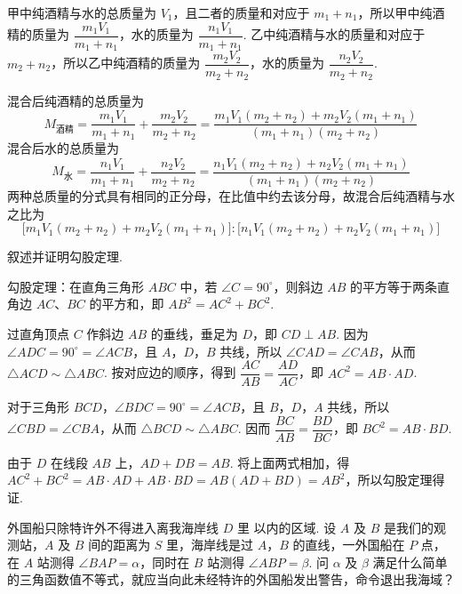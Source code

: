 \begin{solution}
甲中纯酒精与水的总质量为 \(V_{1}\)，且二者的质量和对应于 \(m_{1}+n_{1}\)，所以甲中纯酒精的质量为 \(\dfrac{m_{1}V_{1}}{m_{1}+n_{1}}\)，水的质量为 \(\dfrac{n_{1}V_{1}}{m_{1}+n_{1}}\). 乙中纯酒精与水的质量和对应于 \(m_{2}+n_{2}\)，所以乙中纯酒精的质量为 \(\dfrac{m_{2}V_{2}}{m_{2}+n_{2}}\)，水的质量为 \(\dfrac{n_{2}V_{2}}{m_{2}+n_{2}}\).

混合后纯酒精的总质量为
\[
M_{\text{酒精}}=\frac{m_{1}V_{1}}{m_{1}+n_{1}}+\frac{m_{2}V_{2}}{m_{2}+n_{2}}=\frac{m_{1}V_{1}(m_{2}+n_{2})+m_{2}V_{2}(m_{1}+n_{1})}{(m_{1}+n_{1})(m_{2}+n_{2})}
\]
混合后水的总质量为
\[
M_{\text{水}}=\frac{n_{1}V_{1}}{m_{1}+n_{1}}+\frac{n_{2}V_{2}}{m_{2}+n_{2}}=\frac{n_{1}V_{1}(m_{2}+n_{2})+n_{2}V_{2}(m_{1}+n_{1})}{(m_{1}+n_{1})(m_{2}+n_{2})}
\]
两种总质量的分式具有相同的正分母，在比值中约去该分母，故混合后纯酒精与水之比为
\[
\bigl[m_{1}V_{1}(m_{2}+n_{2})+m_{2}V_{2}(m_{1}+n_{1})\bigr]:\bigl[n_{1}V_{1}(m_{2}+n_{2})+n_{2}V_{2}(m_{1}+n_{1})\bigr]
\]
\end{solution}

\begin{problem}
叙述并证明勾股定理.
\end{problem}

\begin{solution}
勾股定理：在直角三角形 \(ABC\) 中，若 \(\angle C=90^\circ\)，则斜边 \(AB\) 的平方等于两条直角边 \(AC\)、\(BC\) 的平方和，即 \(AB^2=AC^2+BC^2\).

过直角顶点 \(C\) 作斜边 \(AB\) 的垂线，垂足为 \(D\)，即 \(CD\perp AB\). 因为 \(\angle ADC=90^\circ=\angle ACB\)，且 \(A\)，\(D\)，\(B\) 共线，所以 \(\angle CAD=\angle CAB\)，从而 \(\triangle ACD\sim\triangle ABC\). 按对应边的顺序，得到 \(\dfrac{AC}{AB}=\dfrac{AD}{AC}\)，即 \(AC^2=AB\cdot AD\).

对于三角形 \(BCD\)，\(\angle BDC=90^\circ=\angle ACB\)，且 \(B\)，\(D\)，\(A\) 共线，所以 \(\angle CBD=\angle CBA\)，从而 \(\triangle BCD\sim\triangle ABC\). 因而 \(\dfrac{BC}{AB}=\dfrac{BD}{BC}\)，即 \(BC^2=AB\cdot BD\).

由于 \(D\) 在线段 \(AB\) 上，\(AD+DB=AB\). 将上面两式相加，得 \(AC^2+BC^2=AB\cdot AD+AB\cdot BD=AB(AD+BD)=AB^2\)，所以勾股定理得证.
\end{solution}

\begin{problem}
外国船只除特许外不得进入离我海岸线 \(D\text{ 里}\) 以内的区域. 设 \(A\) 及 \(B\) 是我们的观测站，\(A\) 及 \(B\) 间的距离为 \(S\text{ 里}\)，海岸线是过 \(A\)，\(B\) 的直线，一外国船在 \(P\) 点，在 \(A\) 站测得 \(\angle BAP = \alpha\)，同时在 \(B\) 站测得 \(\angle ABP = \beta\). 问 \(\alpha\) 及 \(\beta\) 满足什么简单的三角函数值不等式，就应当向此未经特许的外国船发出警告，命令退出我海域？
\end{problem}

